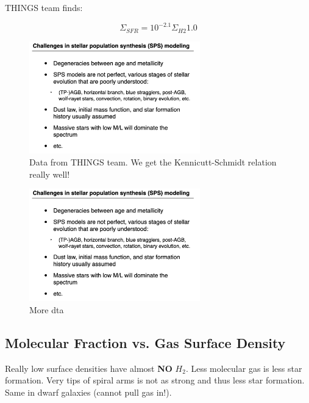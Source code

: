 \documentclass{article}
\begin{document}
THINGS team finds:

\begin{equation}
    \Sigma_{SFR} = 10^{-2.1} \Sigma_{H2}{1.0}
\end{equation}

\begin{figure}
    \centering
    \includegraphics[width=0.66\textwidth]{figs/Screen Shot 2021-09-24 at 9.35.27 AM.png}
    \caption{Data from THINGS team.  We get the Kennicutt-Schmidt relation really well!}
    \label{fig:THINGS_data}
\end{figure}

\begin{figure}
    \centering
    \includegraphics[width=0.66\textwidth]{figs/Screen Shot 2021-09-24 at 9.35.27 AM.png}
    \caption{More dta}
    \label{fig:krumholz}
\end{figure}

\subsection{Molecular Fraction vs. Gas Surface Density}

Really low surface densities have almost \textbf{NO} $H_2$. Less molecular gas is less star formation. Very tips of spiral arms is not as strong and thus less star formation. Same in dwarf galaxies (cannot pull gas in!). 
\end{document}
